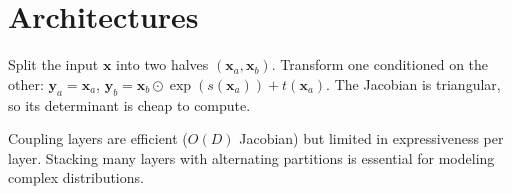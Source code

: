 \documentclass[rep, style=ml]{lexnote}
\begin{document}
\section{Architectures}

\begin{defbox}
  Split the input $\mathbf{x}$ into two halves $(\mathbf{x}_a, \mathbf{x}_b)$.
  Transform one conditioned on the other:
  $\mathbf{y}_a = \mathbf{x}_a$,\quad
  $\mathbf{y}_b = \mathbf{x}_b \odot \exp(s(\mathbf{x}_a)) + t(\mathbf{x}_a)$.
  The Jacobian is triangular, so its determinant is cheap to compute.
\end{defbox}

\begin{rem}
  Coupling layers are efficient ($O(D)$ Jacobian) but limited in
  expressiveness per layer. Stacking many layers with alternating
  partitions is essential for modeling complex distributions.
\end{rem}


\printbibliography
\end{document}
